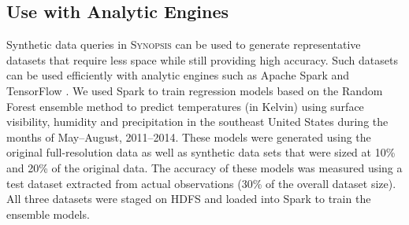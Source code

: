 \subsection{Use with Analytic Engines}
Synthetic data queries in \textsc{Synopsis} can be used to generate representative datasets that require less space while still providing high accuracy.  
Such datasets can be used efficiently with analytic engines such as Apache Spark \cite{zaharia2010spark} and TensorFlow \cite{tensorflow}.  
We used Spark to train regression models based on the Random Forest ensemble method to predict temperatures (in Kelvin) using surface visibility, humidity and precipitation in the southeast United States during the months of May--August, 2011--2014.
These models were generated using the original full-resolution data as well as synthetic data sets that were sized at 10\% and 20\% of the original data.
The accuracy of these models was measured using a test dataset extracted from actual observations (30\% of the overall dataset size).
All three datasets were staged on HDFS and loaded into Spark to train the ensemble models.

